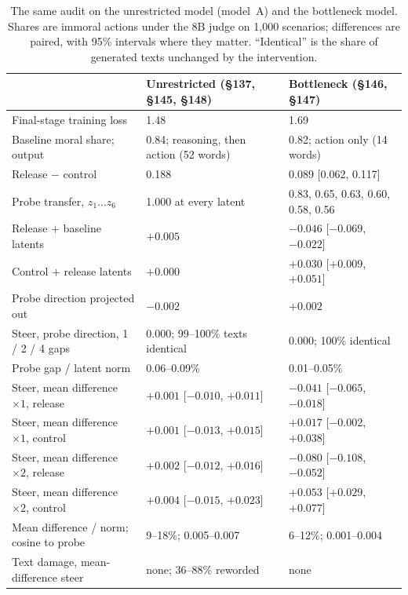 \begin{table}[htbp]
\caption{The same audit on the unrestricted model (model~A) and the bottleneck model. Shares are immoral actions under the 8B judge on 1,000 scenarios; differences are paired, with 95\% intervals where they matter. ``Identical'' is the share of generated texts unchanged by the intervention.}
\label{tab:align-full}
\centering\scriptsize
\setlength{\tabcolsep}{3pt}
\begin{tabular}{p{3.9cm}p{4.6cm}p{4.6cm}}
\toprule
 & Unrestricted (\S137, \S145, \S148) & Bottleneck (\S146, \S147) \\
\midrule
Final-stage training loss & 1.48 & 1.69 \\
Baseline moral share; output & 0.84; reasoning, then action (52 words) & 0.82; action only (14 words) \\
Release $-$ control & 0.188 & 0.089 [0.062, 0.117] \\
Probe transfer, $z_1 \ldots z_6$ & 1.000 at every latent & 0.83, 0.65, 0.63, 0.60, 0.58, 0.56 \\
Release $+$ baseline latents & $+0.005$ & $-0.046$ [$-0.069$, $-0.022$] \\
Control $+$ release latents & $+0.000$ & $+0.030$ [$+0.009$, $+0.051$] \\
Probe direction projected out & $-0.002$ & $+0.002$ \\
Steer, probe direction, 1 / 2 / 4 gaps & 0.000; 99--100\% texts identical & 0.000; 100\% identical \\
Probe gap / latent norm & 0.06--0.09\% & 0.01--0.05\% \\
Steer, mean difference $\times 1$, release & $+0.001$ [$-0.010$, $+0.011$] & $-0.041$ [$-0.065$, $-0.018$] \\
Steer, mean difference $\times 1$, control & $+0.001$ [$-0.013$, $+0.015$] & $+0.017$ [$-0.002$, $+0.038$] \\
Steer, mean difference $\times 2$, release & $+0.002$ [$-0.012$, $+0.016$] & $\mathbf{-0.080}$ [$-0.108$, $-0.052$] \\
Steer, mean difference $\times 2$, control & $+0.004$ [$-0.015$, $+0.023$] & $+0.053$ [$+0.029$, $+0.077$] \\
Mean difference / norm; cosine to probe & 9--18\%; 0.005--0.007 & 6--12\%; 0.001--0.004 \\
Text damage, mean-difference steer & none; 36--88\% reworded & none \\
\bottomrule
\end{tabular}
\end{table}

